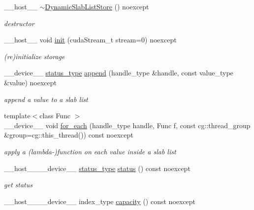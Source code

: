 \begin{DoxyCompactItemize}
\+\_\+\+\_\+host\+\_\+\+\_\+ \hyperlink{classwarpcore_1_1storage_1_1multi__value_1_1DynamicSlabListStore_ab53d32d2ef4976130ae986c866802b6d}{$\sim$\+Dynamic\+Slab\+List\+Store} () noexcept
\begin{DoxyCompactList}\small\item\em destructor \end{DoxyCompactList}\item 
\+\_\+\+\_\+host\+\_\+\+\_\+ void \hyperlink{classwarpcore_1_1storage_1_1multi__value_1_1DynamicSlabListStore_aa04bc2372b17856c61acd08d07381315}{init} (cuda\+Stream\+\_\+t stream=0) noexcept
\begin{DoxyCompactList}\small\item\em (re)initialize storage \end{DoxyCompactList}\item 
\+\_\+\+\_\+device\+\_\+\+\_\+ \hyperlink{classwarpcore_1_1Status}{status\+\_\+type} \hyperlink{classwarpcore_1_1storage_1_1multi__value_1_1DynamicSlabListStore_adc50985c5bd1ed3b507c1e3c7dda16db}{append} (handle\+\_\+type \&handle, const value\+\_\+type \&value) noexcept
\begin{DoxyCompactList}\small\item\em append a value to a slab list \end{DoxyCompactList}\item 
{\footnotesize template$<$class Func $>$ }\\\+\_\+\+\_\+device\+\_\+\+\_\+ void \hyperlink{classwarpcore_1_1storage_1_1multi__value_1_1DynamicSlabListStore_a58a0c59ab8d635869043921c9ec85c21}{for\+\_\+each} (handle\+\_\+type handle, Func f, const cg\+::thread\+\_\+group \&group=cg\+::this\+\_\+thread()) const noexcept
\begin{DoxyCompactList}\small\item\em apply a (lambda-\/)function on each value inside a slab list \end{DoxyCompactList}\item 
\+\_\+\+\_\+host\+\_\+\+\_\+\+\_\+\+\_\+device\+\_\+\+\_\+ \hyperlink{classwarpcore_1_1Status}{status\+\_\+type} \hyperlink{classwarpcore_1_1storage_1_1multi__value_1_1DynamicSlabListStore_a9f67ef2bd0b072938bce462656b2c8aa}{status} () const noexcept
\begin{DoxyCompactList}\small\item\em get status \end{DoxyCompactList}\item 
\+\_\+\+\_\+host\+\_\+\+\_\+\+\_\+\+\_\+device\+\_\+\+\_\+ index\+\_\+type \hyperlink{classwarpcore_1_1storage_1_1multi__value_1_1DynamicSlabListStore_ae1c489e608b429bb34ad138c59aded93}{capacity} () const noexcept

\end{DoxyCompactItemize}
